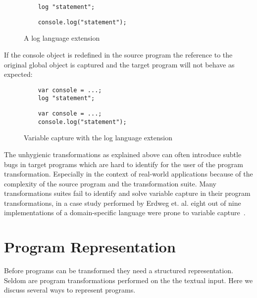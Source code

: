 \begin{figure}[!h]
\begin{minipage}{0.45\textwidth}
	\begin{lstlisting}
	log "statement";
	\end{lstlisting}
\end{minipage}
\hfill
\begin{minipage}{0.45\textwidth}
	\begin{lstlisting}
	console.log("statement");
	\end{lstlisting}
\end{minipage}
\caption{A log language extension}
\end{figure}

If the console object is redefined in the source program the reference to the original global object is captured and the target program will not behave as expected:

\begin{figure}[!h]
\begin{minipage}{0.45\textwidth}
	\begin{lstlisting}
	var console = ...;	
	log "statement";
	\end{lstlisting}
\end{minipage}
\hfill
\begin{minipage}{0.45\textwidth}
	\begin{lstlisting}
	var console = ...;	
	console.log("statement");
	\end{lstlisting}
\end{minipage}
\caption{Variable capture with the log language extension}
\end{figure}

The unhygienic transformations as explained above can often introduce subtle bugs in target programs which are hard to identify for the user of the program transformation. Especially in the context of real-world applications because of the complexity of the source program and the transformation suite. Many transformations suites fail to identify and solve variable capture in their program transformations, in a case study performed by Erdweg et. al. eight out of nine implementations of a domain-specific language were prone to variable capture~\cite{Erdweg2014a}.

\section{Program Representation} \label{program-representation}
Before programs can be transformed they need a structured representation. Seldom are program transformations performed on the the textual input. Here we discuss several ways to represent programs.

